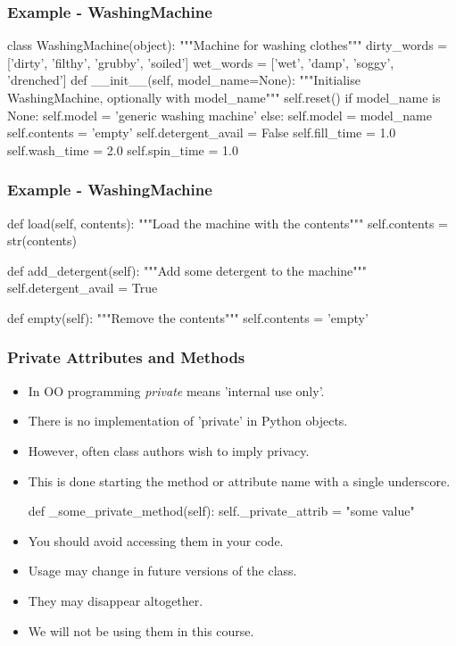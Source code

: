 \documentclass{beamer}
\begin{document}
\begin{frame}[fragile]
\frametitle{Example - WashingMachine}
\begin{code}
class WashingMachine(object):
    """Machine for washing clothes"""
    dirty_words = ['dirty', 'filthy', 'grubby', 'soiled']
    wet_words = ['wet', 'damp', 'soggy', 'drenched']
    def __init__(self, model_name=None):
        """Initialise WashingMachine, optionally with model_name"""
        self.reset()
        if model_name is None:
            self.model = 'generic washing machine'
        else:
            self.model = model_name
        self.contents = 'empty'
        self.detergent_avail = False
        self.fill_time = 1.0
        self.wash_time = 2.0
        self.spin_time = 1.0
\end{code}
\end{frame}

\begin{frame}[fragile]
\frametitle{Example - WashingMachine}
\begin{code}
    def load(self, contents):
        """Load the machine with the contents"""
        self.contents = str(contents)
        
    def add_detergent(self):
        """Add some detergent to the machine"""
        self.detergent_avail = True
        
    def empty(self):
        """Remove the contents"""
        self.contents = 'empty'
\end{code}
\end{frame}

\begin{frame}[fragile]
\frametitle{Private Attributes and Methods}

\begin{itemize}
\item In OO programming \emph{private} means 'internal use only'.
\item There is no implementation of 'private' in Python objects.
\item However, often class authors wish to imply privacy.
\item This is done starting the method or attribute name with a single underscore.
\begin{code}
  def _some_private_method(self):
    self._private_attrib = "some value"
\end{code}

\item You should avoid accessing them in your code.
\item Usage may change in future versions of the class.
\item They may disappear altogether.
\item We will not be using them in this course.
\end{itemize}

\end{frame}
\end{document}
